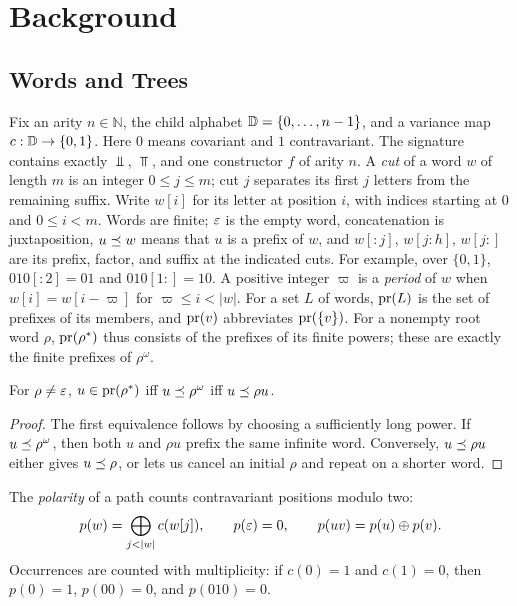 \section{Background}
\label{sec:background}

\subsection{Words and Trees}\label{sec:words}
Fix an arity $n\in\mathbb N$, the child alphabet $\mathbb{D}=\{0,\ldots,n-1\}$,
and a variance map
$c:\mathbb{D}\to\{0,1\}$. Here $0$ means covariant and $1$ contravariant.
The signature contains exactly $\Bot$, $\Top$, and one constructor $f$ of arity $n$.
A \emph{cut} of a word $w$ of length $m$ is an integer $0\le j\le m$;
cut $j$ separates its first $j$ letters from the remaining suffix.
Write $w[i]$ for its letter at position $i$, with indices starting at $0$
and $0\le i<m$. Words are finite; $\varepsilon$ is the empty word, concatenation is juxtaposition,
$u\preceq w$ means that $u$ is a prefix of $w$, and $w[:j]$, $w[j:h]$, $w[j:]$
are its prefix, factor, and suffix at the indicated cuts. For example, over
$\{0,1\}$, $010[:2]=01$ and $010[1:]=10$. A positive integer $\varpi$ is a
\emph{period} of $w$ when $w[i]=w[i-\varpi]$ for $\varpi\le i<|w|$.
For a set $L$ of words, $\operatorname{pr}(L)$ is the set of prefixes of its members, and
$\operatorname{pr}(v)$ abbreviates $\operatorname{pr}(\{v\})$. For a nonempty root word $\rho$,
$\operatorname{pr}(\rho^*)$ thus consists of the prefixes of its finite powers; these are
exactly the finite prefixes of $\rho^\omega$.

\begin{lemma}\label{lem:periodic}
For $\rho\ne\varepsilon$, $u\in\operatorname{pr}(\rho^*)$ iff $u\preceq\rho^\omega$ iff $u\preceq\rho u$.
\end{lemma}
\begin{proof}
The first equivalence follows by choosing a sufficiently long power. If
$u\preceq\rho^\omega$, then both $u$ and $\rho u$ prefix the same infinite word.
Conversely, $u\preceq\rho u$ either gives $u\preceq\rho$, or lets us cancel an
initial $\rho$ and repeat on a shorter word.
\end{proof}

The \emph{polarity} of a path counts contravariant positions modulo two:
\begin{equation}\label{eq:g1}
 p(w)=\bigoplus_{j<|w|}c(w[j]),\qquad p(\eps)=0,\qquad p(uv)=p(u)\oplus p(v).
\end{equation}
Occurrences are counted with multiplicity: if $c(0)=1$ and $c(1)=0$, then
$p(0)=1$, $p(00)=0$, and $p(010)=0$.

